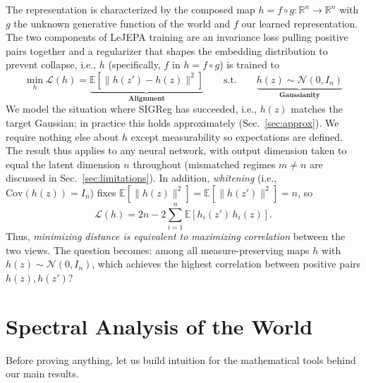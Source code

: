 \documentclass{article}
\begin{document}
The representation is characterized by the composed map $h = f \circ g : \mathbb{R}^n \to \mathbb{R}^n$ with $g$ the unknown generative function of the world and $f$ our learned representation.
The two components of LeJEPA \citep{balestriero2025lejepa} training are an invariance loss pulling positive pairs together and a regularizer that shapes the embedding distribution to prevent collapse, i.e., $h$ (specifically, $f$ in $h=f \circ g$) is trained to
\begin{equation}
    \min_h \mathcal{L}(h) = \underbrace{\mathbb{E}\!\left[\|h(z') - h(z)\|^2\right]}_{\textbf{Alignment}} \qquad \text{s.t.} \qquad \underbrace{h(z) \sim \mathcal{N}(0, I_n)}_{\textbf{Gaussianity}}
\end{equation}
We model the situation where SIGReg has succeeded, i.e., $h(z)$ matches the target Gaussian; in practice this holds approximately (Sec.~\ref{sec:approx}).
We require nothing else about $h$ except measurability so expectations are defined.
The result thus applies to any neural network, with output dimension taken to equal the latent dimension $n$ throughout (mismatched regimes $m \neq n$ are discussed in Sec.~\ref{sec:limitations}).
In addition, \textit{whitening} (i.e., $\mathrm{Cov}(h(z)) = I_n$) fixes $\mathbb{E}[\|h(z)\|^2] = \mathbb{E}[\|h(z')\|^2] = n$, so
\begin{equation}\label{eq:loss-expand}
    \mathcal{L}(h) = 2n - 2\sum_{i=1}^n \mathbb{E}\!\left[h_i(z')\, h_i(z)\right].
\end{equation}
Thus, \emph{minimizing distance is equivalent to maximizing correlation} between the two views. The question becomes: among all measure-preserving maps $h$ with $h(z) \sim \mathcal{N}(0, I_n)$, which achieves the highest correlation between positive pairs $h(z), h(z')$?


\section{Spectral Analysis of the World}\label{sec:spectral}

Before proving anything, let us build intuition for the mathematical tools behind our main results. 
\end{document}
